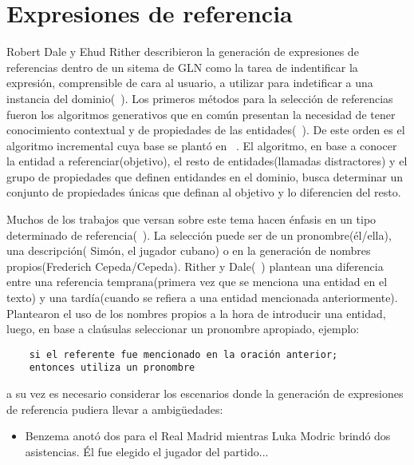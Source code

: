 \section{Expresiones de referencia}

    Robert Dale y Ehud Rither describieron la generación de expresiones de referencias dentro de un sitema de GLN como la tarea de 
indentificar la expresión, comprensible de cara al usuario, a utilizar para indetificar a una instancia del dominio(~\cite{reiter_dale_2000,Gatt2018SurveyOT}). 
Los primeros m\'etodos para la selección de referencias fueron los algoritmos generativos que en común presentan la necesidad de tener conocimiento 
contextual y de propiedades de las entidades(~\cite{Gatt2018SurveyOT}). De este orden es el algoritmo incremental cuya base se plant\'o en ~\cite{dale1995computational}. 
El algoritmo, en base a conocer la entidad a referenciar(objetivo), el resto de entidades(llamadas distractores) y el grupo de propiedades que definen entidandes en el dominio,
busca determinar un conjunto de propiedades \'unicas que definan al objetivo y lo diferencien del resto.

    Muchos de los trabajos que versan sobre este tema hacen énfasis en un tipo determinado de referencia(~\cite{ferreira2018neuralreg}). La selección 
puede ser de un pronombre(\'el/ella), una descripci\'on( Sim\'on, el jugador cubano) o en la generación de nombres propios(Frederich Cepeda/Cepeda). 
Rither y Dale(~\cite{reiter_dale_2000}) plantean una diferencia entre una referencia temprana(primera vez que se menciona una 
entidad en el texto) y una tard\'ia(cuando se refiera a una entidad mencionada anteriormente). Plantearon el uso de los nombres propios a la hora 
de introducir una entidad, luego, en base a cla\'usulas seleccionar un pronombre apropiado, ejemplo:

\begin{verbatim}
    si el referente fue mencionado en la oración anterior;
    entonces utiliza un pronombre
\end{verbatim}

a su vez es necesario considerar los escenarios donde la generaci\'on de expresiones de referencia pudiera llevar a ambigüedades:

\begin{itemize}
    \item Benzema anotó dos para el Real Madrid mientras Luka Modric brindó dos asistencias. Él fue elegido el jugador del partido... 
\end{itemize}

